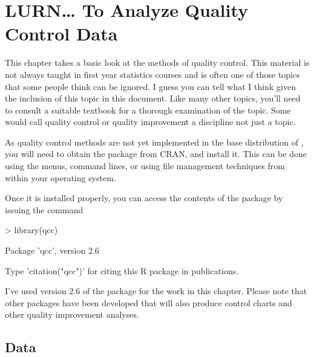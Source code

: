 



\chapter{LURN\ldots{} To Analyze Quality Control Data} 
\label{QualityControl} 
 



 
This chapter takes a basic look at the methods of quality control. This material is not always taught in first year statistics courses and is often one of those topics that some people think can be ignored. I guess you can tell what I think given the inclusion of this topic in this document. Like many other topics, you'll need to consult a suitable textbook for a thorough examination of the topic. Some would call quality control or quality improvement a discipline not just a topic. 
 
As quality control methods are not yet implemented in the base distribution of \R{}, you will need to obtain the  package from CRAN, and install it. This can be done using the menus, command lines, or using file management techniques from within your operating system. 
 
Once it is installed properly, you can access the contents of the package by issuing the command 

\begin{Schunk}
\begin{Sinput}
> library(qcc) 
\end{Sinput}
\begin{Soutput}
Package 'qcc', version 2.6
\end{Soutput}
\begin{Soutput}
Type 'citation("qcc")' for citing this R package in publications.
\end{Soutput}
\end{Schunk}

 
I've used version 2.6 of the  package for the work in this chapter. Please note that other packages have been developed that will also produce control charts and other quality improvement analyses. 
 
 
\section{Data} 
 
